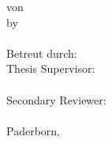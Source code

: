 \begin{titlepage}
\begin{center}
		\ifgerman
			von\\
		\else
			by\\
		\fi 
		{\Large\textsc{\theauthor{}}}\\[30pt]

		\ifgerman
			Betreut durch:\\
		\else
			Thesis Supervisor:\\
		\fi 
		{\large \thesupervisor{}}\\[30pt]

		Secondary Reviewer:\\
		{\large \thesecreviewer{}}\\[30pt]

		Paderborn, \thesubmissiondate{}
	\end{center}
\end{titlepage}
